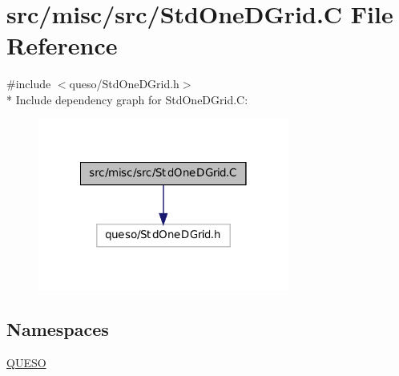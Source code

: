 \hypertarget{_std_one_d_grid_8_c}{\section{src/misc/src/\-Std\-One\-D\-Grid.C File Reference}
\label{_std_one_d_grid_8_c}
}
{\ttfamily \#include $<$queso/\-Std\-One\-D\-Grid.\-h$>$}\\*
Include dependency graph for Std\-One\-D\-Grid.\-C\-:
\nopagebreak
\begin{figure}[H]
\begin{center}
\leavevmode
\includegraphics[width=234pt]{_std_one_d_grid_8_c__incl}
\end{center}
\end{figure}
\subsection*{Namespaces}
\begin{DoxyCompactItemize}
\item 
\hyperlink{namespace_q_u_e_s_o}{Q\-U\-E\-S\-O}
\end{DoxyCompactItemize}

